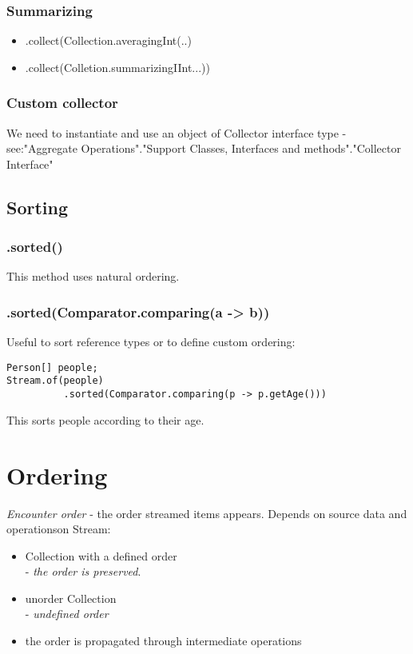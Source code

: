 \documentclass{report}
\begin{document}
\subsection{Summarizing}
\begin{itemize}
	\item .collect(Collection.averagingInt(..)
	\item .collect(Colletion.summarizingIInt...))
\end{itemize}

\subsection{Custom collector}
We need to instantiate and use an object of Collector interface type - 
see:"Aggregate Operations"."Support Classes, Interfaces and methods"."Collector Interface"

\section{Sorting}
\subsection{.sorted()}
This method uses natural ordering.

\subsection{.sorted(Comparator.comparing(a -> b))}
Useful to sort reference types or to define custom ordering:
\begin{verbatim}
Person[] people;
Stream.of(people)
          .sorted(Comparator.comparing(p -> p.getAge()))
\end{verbatim}
This sorts people according to their age.

\chapter{Ordering}
\textit{Encounter order} - the order streamed items appears. Depends on source data and operationson Stream:
\begin{itemize}
	\item Collection with a defined order\\
	- \textit{the order is preserved}.
	\item unorder Collection\\
	- \textit{undefined order}
	\item the order is propagated through intermediate operations
\end{itemize}
\end{document}

